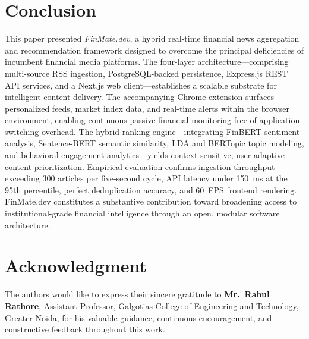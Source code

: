 \documentclass[conference]{IEEEtran}
\begin{document}
\section{Conclusion}

This paper presented \textit{FinMate.dev}, a hybrid real-time financial news aggregation and recommendation framework designed to overcome the principal deficiencies of incumbent financial media platforms. The four-layer architecture—comprising multi-source RSS ingestion, PostgreSQL-backed persistence, Express.js REST API services, and a Next.js web client—establishes a scalable substrate for intelligent content delivery. The accompanying Chrome extension surfaces personalized feeds, market index data, and real-time alerts within the browser environment, enabling continuous passive financial monitoring free of application-switching overhead. The hybrid ranking engine—integrating FinBERT sentiment analysis, Sentence-BERT semantic similarity, LDA and BERTopic topic modeling, and behavioral engagement analytics—yields context-sensitive, user-adaptive content prioritization. Empirical evaluation confirms ingestion throughput exceeding 300 articles per five-second cycle, API latency under 150~ms at the 95th percentile, perfect deduplication accuracy, and 60~FPS frontend rendering. FinMate.dev constitutes a substantive contribution toward broadening access to institutional-grade financial intelligence through an open, modular software architecture.

\section*{Acknowledgment}

The authors would like to express their sincere gratitude to \textbf{Mr.~Rahul Rathore}, Assistant Professor, Galgotias College of Engineering and Technology, Greater Noida, for his valuable guidance, continuous encouragement, and constructive feedback throughout this work.
\end{document}
